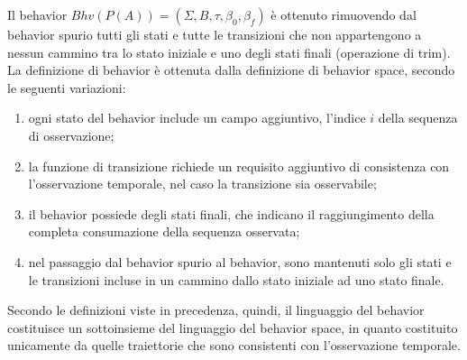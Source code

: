 Il behavior $Bhv(P(A)) = (\Sigma,B,\tau,\beta_0,\beta_f)$ è ottenuto rimuovendo dal behavior spurio tutti gli stati e tutte le transizioni che non appartengono a nessun cammino tra lo stato iniziale e uno degli stati finali (operazione di trim).
La definizione di behavior è ottenuta dalla definizione di behavior space, secondo le seguenti variazioni:
\begin{enumerate}
\item ogni stato del behavior include un campo aggiuntivo, l'indice $i$ della sequenza di osservazione;
\item la funzione di transizione richiede un requisito aggiuntivo di consistenza con l'osservazione temporale, nel caso la transizione sia osservabile;
\item il behavior possiede degli stati finali, che indicano il raggiungimento della completa consumazione della sequenza osservata;
\item nel passaggio dal behavior spurio al behavior, sono mantenuti solo gli stati e le transizioni incluse in un cammino dallo stato iniziale ad uno stato finale.
\end{enumerate}
Secondo le definizioni viste in precedenza, quindi, il linguaggio del behavior costituisce un sottoinsieme del linguaggio del behavior space, in quanto costituito unicamente da quelle traiettorie che sono consistenti con l'osservazione temporale.